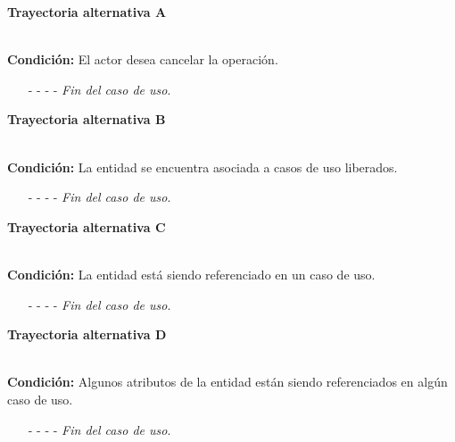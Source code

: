 \hypertarget{CU7-3:TAA}{\textbf{Trayectoria alternativa A}}\\
\noindent \textbf{Condición:} El actor desea cancelar la operación.
\begin{enumerate}
	\UCpaso[\UCactor] Oprime el botón  de la pantalla emergente.
	\UCpaso[\UCsist] Muestra la pantalla .
	\item[- -] - - {\em {Fin del caso de uso}}.%
\end{enumerate}		
\hypertarget{CU7-3:TAB}{\textbf{Trayectoria alternativa B}}\\
\noindent \textbf{Condición:} La entidad se encuentra asociada a casos de uso liberados.
\begin{enumerate}
	\UCpaso[\UCsist] Oculta el botón \eliminar de la entidad que esta asociada a casos de uso liberados.
	\item[- -] - - {\em {Fin del caso de uso}}.
\end{enumerate}
\hypertarget{CU7-3:TAC}{\textbf{Trayectoria alternativa C}}\\
\noindent \textbf{Condición:} La entidad está siendo referenciado en un caso de uso.
\begin{enumerate}
	\UCpaso[\UCsist] Muestra el mensaje  en la pantalla  en una pantalla emergente con la lista de casos de uso que están referenciando a la entidad.
	\item[- -] - - {\em {Fin del caso de uso}}.
\end{enumerate}
\hypertarget{CU7-3:TAD}{\textbf{Trayectoria alternativa D}}\\
\noindent \textbf{Condición:} Algunos atributos de la entidad están siendo referenciados en algún caso de uso.
\begin{enumerate}
	\UCpaso[\UCsist] Muestra el mensaje  en la pantalla  en una pantalla emergente con la lista de elementos que están referenciando al atributo de la entidad.
	\item[- -] - - {\em {Fin del caso de uso}}.
\end{enumerate}
	

